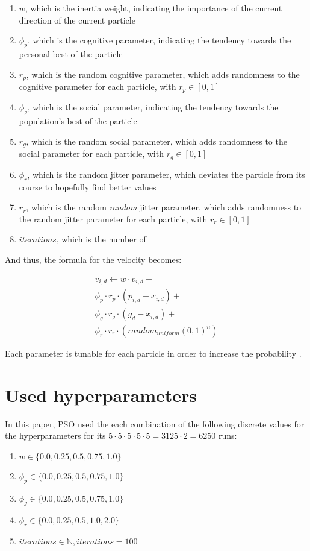 \documentclass[conference]{IEEEtran}
\begin{document}
\begin{enumerate}
    \item $w$, which is the inertia weight, indicating the importance of the current direction of the current particle 
    \item $\phi_p$, which is the cognitive parameter, indicating the tendency towards the personal best of the particle
    \item $r_p$, which is the random cognitive parameter, which adds randomness to the cognitive parameter for each particle, with $r_p \in [0, 1]$
    \item $\phi_g$, which is the social parameter, indicating the tendency towards the population's best of the particle
    \item $r_g$, which is the random social parameter, which adds randomness to the social parameter for each particle, with $r_g \in [0, 1]$ 
    \item $\phi_r$, which is the random jitter parameter, which deviates the particle from its course to hopefully find better values
    \item $r_r$, which is the random \textit{random} jitter parameter, which adds randomness to the random jitter parameter for each particle, with $r_r \in [0, 1]$
    \item $iterations$, which is the number of 
\end{enumerate}

And thus, the formula for the velocity becomes:

\begin{multline}
    v_{i,d} \leftarrow w \cdot v_{i,d}  + \\ \phi_p \cdot r_p \cdot (p_{i,d} - x_{i,d})  + \\ \phi_g \cdot r_g \cdot (g_d - x_{i,d}) + \\ \phi_r \cdot r_r \cdot (random_{uniform}(0, 1)^n)
\end{multline}

Each parameter is tunable for each particle in order to increase the probability .

\section{Used hyperparameters}
In this paper, PSO used the each combination of the following discrete values for the hyperparameters for its $5 \cdot 5 \cdot 5 \cdot 5 \cdot 5 = 3125 \cdot 2 = 6250$ runs:

\begin{enumerate}
    \item $w \in \{0.0, 0.25, 0.5, 0.75, 1.0\}$
    \item $\phi_p \in \{0.0, 0.25, 0.5, 0.75, 1.0\}$
    \item $\phi_g \in \{0.0, 0.25, 0.5, 0.75, 1.0\}$
    \item $\phi_r \in \{0.0, 0.25, 0.5, 1.0, 2.0\}$
    \item $iterations \in \mathbb{N}, iterations = 100$
\end{enumerate}
\end{document}
